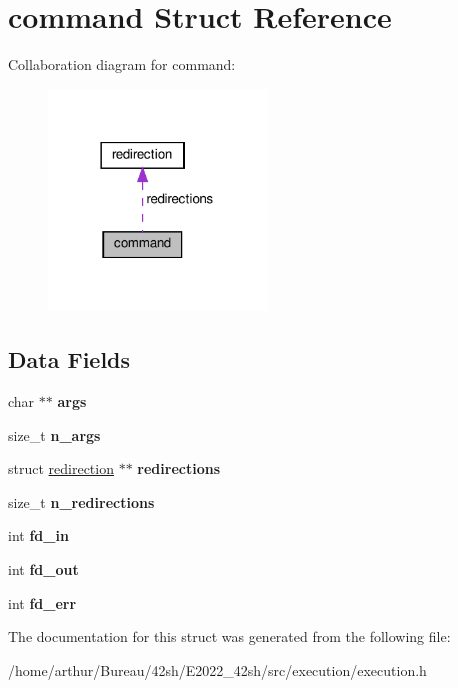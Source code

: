 \hypertarget{structcommand}{}\section{command Struct Reference}
\label{structcommand}


Collaboration diagram for command\+:
\nopagebreak
\begin{figure}[H]
\begin{center}
\leavevmode
\includegraphics[width=165pt]{structcommand__coll__graph}
\end{center}
\end{figure}
\subsection*{Data Fields}
\begin{DoxyCompactItemize}
\item 
\mbox{\label{structcommand_aa24f72e6a4d6a997528142211b375496}} 
char $\ast$$\ast$ {\bfseries args}
\item 
\mbox{\label{structcommand_a86a138c8cdfe5be5a18e6e1dc43732bb}} 
size\+\_\+t {\bfseries n\+\_\+args}
\item 
\mbox{\label{structcommand_aa28230df5775c93b52a8dd7419867331}} 
struct \hyperlink{structredirection}{redirection} $\ast$$\ast$ {\bfseries redirections}
\item 
\mbox{\label{structcommand_aadcd761872e28be6c5138fbac5861cbc}} 
size\+\_\+t {\bfseries n\+\_\+redirections}
\item 
\mbox{\label{structcommand_aa99784c5e39bc01a4eb26b588d24170e}} 
int {\bfseries fd\+\_\+in}
\item 
\mbox{\label{structcommand_a4d637057db9ca396d66529aeb27bb3b7}} 
int {\bfseries fd\+\_\+out}
\item 
\mbox{\label{structcommand_a772f17bee10ee3a2118154f4bd483f67}} 
int {\bfseries fd\+\_\+err}
\end{DoxyCompactItemize}


The documentation for this struct was generated from the following file\+:\begin{DoxyCompactItemize}
\item 
/home/arthur/\+Bureau/42sh/\+E2022\+\_\+42sh/src/execution/execution.\+h\end{DoxyCompactItemize}
